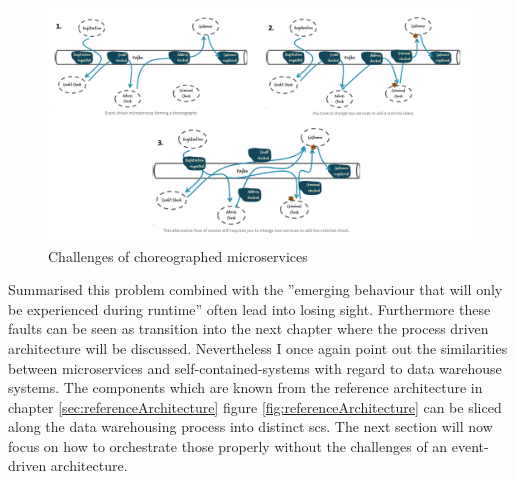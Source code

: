 \begin{figure}[!htb]
    \centering
    \includegraphics[scale=0.33]{pictures/FlowOfEvents.png}
    \caption{Challenges of choreographed microservices \cite{eventDrivenMicroservices}}
    \label{fig:chalengesChoreographedMicroservices}
\end{figure}

Summarised this problem combined with the ''emerging behaviour that will only be experienced during runtime''\cite{eventDrivenMicroservices} often lead into losing sight.\newline
Furthermore these faults can be seen as transition into the next chapter where the process driven architecture will be discussed. Nevertheless I once again point out the similarities between microservices and self-contained-systems with regard to data warehouse systems. The components which are known from the reference architecture in chapter \ref{sec:referenceArchitecture} figure \ref{fig:referenceArchitecture} can be sliced along the data warehousing process into distinct scs.\newline
The next section will now focus on how to orchestrate those properly without the challenges of an event-driven architecture. 